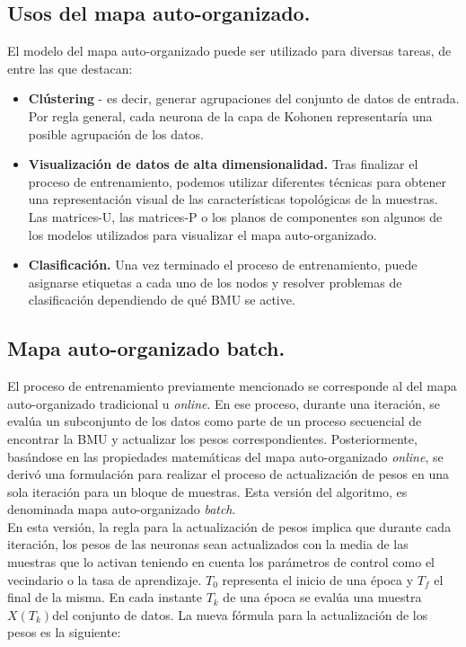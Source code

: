 \subsection{Usos del mapa auto-organizado.}
El modelo del mapa auto-organizado puede ser utilizado para diversas tareas, de entre las que destacan:

\begin{itemize}
	\item \textbf{Clústering} - es decir, generar agrupaciones del conjunto de datos de entrada. Por regla general, cada neurona de la capa de Kohonen representaría una posible agrupación de los datos. 

	\item \textbf{Visualización de datos de alta dimensionalidad.} Tras finalizar el proceso de entrenamiento, podemos utilizar diferentes técnicas para obtener una representación visual de las características topológicas de la muestras. Las matrices-U, las matrices-P o los planos de componentes son algunos de los modelos utilizados para visualizar el mapa auto-organizado.

	\item \textbf{Clasificación.} Una vez terminado el proceso de entrenamiento, puede asignarse etiquetas a cada uno de los nodos y resolver problemas de clasificación dependiendo de qué BMU se active. 
	\end{itemize}

\subsection{Mapa auto-organizado batch.}
El proceso de entrenamiento previamente mencionado se corresponde al del mapa auto-organizado tradicional u \textit{online}. En ese proceso, durante una iteración, se evalúa un subconjunto de los datos como parte de un proceso secuencial de encontrar la BMU y actualizar los pesos correspondientes. Posteriormente, basándose en las propiedades matemáticas del mapa auto-organizado \textit{online}, se derivó una formulación para realizar el proceso de actualización de pesos en una sola iteración para un bloque de muestras. Esta versión del algoritmo, es denominada mapa auto-organizado \textit{batch}. \\

En esta versión, la regla para la actualización de pesos implica que durante cada iteración, los pesos de las neuronas sean actualizados con la media de las muestras que lo activan teniendo en cuenta los parámetros de control como el vecindario o la tasa de aprendizaje. $T_0$ representa el inicio de una época y $T_f$ el final de la misma. En cada instante $T_k$ de una época se evalúa una muestra $X(T_k) $del conjunto de datos. La nueva fórmula para la actualización de los pesos es la siguiente:\\

